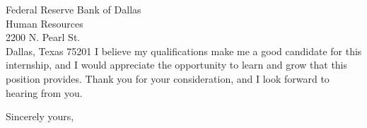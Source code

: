 \documentclass{letter} %
\begin{document}
\begin{letter}{Federal Reserve Bank of Dallas \\
Human Resources \\
2200 N. Pearl St. \\
Dallas, Texas 75201}
\noindent I believe my qualifications make me a good candidate for this
internship, and I would appreciate the opportunity to learn and grow
that this position provides. Thank you for your consideration, and I
look forward to hearing from you.

 
\closing{Sincerely yours,} 
 

 

\end{letter}
 
\end{document}
